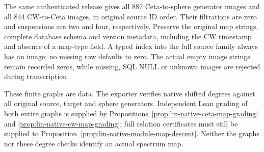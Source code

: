 \begin{definition}
  \label{def:lin-native-complete-map-graphs}
  \leanok
  The same authenticated release gives all 887 Ceta-to-sphere generator
  images and all 844 CW-to-Ceta images, in original source ID order.
  Their filtrations are zero and suspensions are two and four, respectively.
  Preserve the original map strings, complete database schema and version
  metadata, including the CW timestamp and absence of a map-type field.
  A typed index into the full source family always has an image; no missing
  row defaults to zero. The actual empty image strings remain recorded zeros,
  while missing, SQL NULL or unknown images are rejected during transcription.

  These finite graphs are data. The exporter verifies native shifted degrees
  against all original source, target and sphere generators. Independent Lean
  grading of both entire graphs is supplied by
  Propositions~\ref{prop:lin-native-ceta-map-grading} and
  \ref{prop:lin-native-cw-map-grading}; full relation certificates
  must still be supplied to Proposition~\ref{prop:lin-native-module-map-descent}.
  Neither the graphs nor these degree checks identify an actual spectrum map.
\end{definition}


